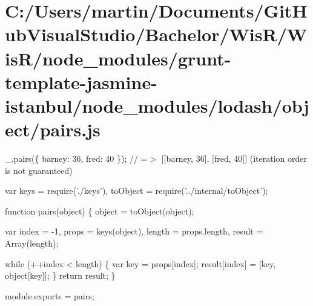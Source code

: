 \hypertarget{_c_1_2_users_2martin_2_documents_2_git_hub_visual_studio_2_bachelor_2_wis_r_2_wis_r_2node_moduleebabdeae616818e8459f6da002772d8b}{}\section{C\+:/\+Users/martin/\+Documents/\+Git\+Hub\+Visual\+Studio/\+Bachelor/\+Wis\+R/\+Wis\+R/node\+\_\+modules/grunt-\/template-\/jasmine-\/istanbul/node\+\_\+modules/lodash/object/pairs.\+js}
\+\_\+.\+pairs(\{ \textquotesingle{}barney\textquotesingle{}\+: 36, \textquotesingle{}fred\textquotesingle{}\+: 40 \}); // =$>$ \mbox{[}\mbox{[}\textquotesingle{}barney\textquotesingle{}, 36\mbox{]}, \mbox{[}\textquotesingle{}fred\textquotesingle{}, 40\mbox{]}\mbox{]} (iteration order is not guaranteed)


\begin{DoxyCodeInclude}
var keys = require(\textcolor{stringliteral}{'./keys'}),
    toObject = require(\textcolor{stringliteral}{'../internal/toObject'});

\textcolor{keyword}{function} pairs(\textcolor{keywordtype}{object}) \{
  \textcolor{keywordtype}{object} = toObject(\textcolor{keywordtype}{object});

  var index = -1,
      props = keys(\textcolor{keywordtype}{object}),
      length = props.length,
      result = Array(length);

  \textcolor{keywordflow}{while} (++index < length) \{
    var key = props[index];
    result[index] = [key, \textcolor{keywordtype}{object}[key]];
  \}
  \textcolor{keywordflow}{return} result;
\}

module.exports = pairs;
\end{DoxyCodeInclude}
 